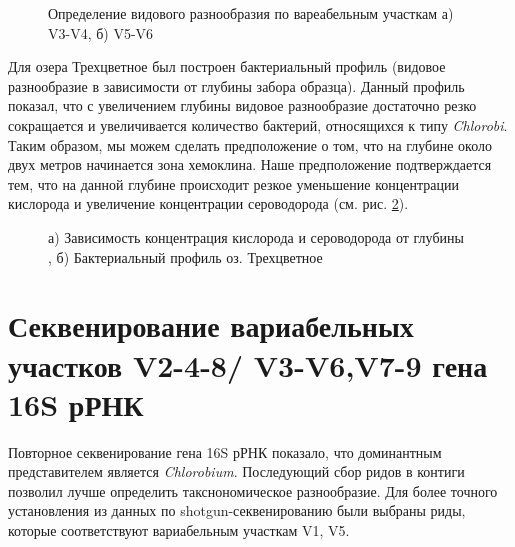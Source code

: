 \begin{figure}[h]
\begin{minipage}[h]{0.5\linewidth}
\end{minipage}
\hfill
\begin{minipage}[h]{0.5\linewidth}
\end{minipage}
\caption{Определение видового разнообразия по вареабельным участкам а) V3-V4, б) V5-V6}
\label{ris:V3-V4, V5-V6}
\end{figure}


Для озера Трехцветное был построен бактериальный профиль (видовое разнообразие в зависимости от глубины забора образца). Данный профиль показал, что с увеличением глубины видовое разнообразие достаточно резко сокращается и увеличивается количество бактерий, относящихся к типу   \textit{Chlorobi}. Таким образом, мы можем сделать предположение о том, что на глубине около двух метров начинается зона хемоклина. Наше предположение подтверждается тем, что на данной глубине происходит резкое уменьшение концентрации кислорода и увеличение концентрации сероводорода (см. рис. \ref{ris:concentr, 3cvet}).  

\begin{figure}[h]
\begin{minipage}[h]{0.5\linewidth}
\end{minipage}
\hfill
\begin{minipage}[h]{0.5\linewidth}
\end{minipage}
\caption{а) Зависимость концентрация кислорода и сероводорода от глубины , б) Бактериальный профиль оз. Трехцветное}
\label{ris:concentr, 3cvet}
\end{figure}

\section{Секвенирование вариабельных участков V2-4-8/ V3-V6,V7-9 гена 16S рРНК} \label{sect2_2}


Повторное секвенирование гена 16S рРНК показало, что доминантным представителем является \textit{Chlorobium}. Последующий сбор ридов в контиги позволил лучше определить такснономическое разнообразие. Для более точного установления из данных по shotgun-секвенированию были выбраны риды, которые соответствуют вариабельным участкам V1, V5. 

